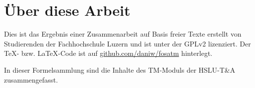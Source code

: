 



\chapter*{Über diese Arbeit}
Dies ist das Ergebnis einer Zusammenarbeit auf Basis freier Texte erstellt von Studierenden der Fachhochschule Luzern und ist unter der GPLv2 lizenziert. Der \TeX - bzw. \LaTeX -Code ist auf \url{github.com/daniw/fosatm} hinterlegt.

In dieser Formelsammlung sind die Inhalte des TM-Moduls der HSLU-T\&A zusammengefasst.
%







